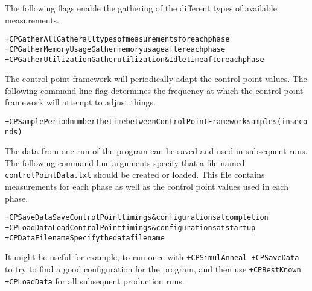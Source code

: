 The following flags enable the gathering of the different types of available measurements.
\begin{alltt} 
        +CPGatherAll            Gather all types of measurements for each phase
+CPGatherMemoryUsage            Gather memory usage after each phase
+CPGatherUtilization            Gather utilization \& Idle time after each phase
\end{alltt} 


The control point framework will periodically adapt the control point values. The following command line flag determines the frequency at which the control point framework will attempt to adjust things.
\begin{alltt} 
     +CPSamplePeriod     number The time between Control Point Framework samples (in seconds)
\end{alltt} 

The data from one run of the program can be saved and used in subsequent runs. The following command line arguments specify that a file named \texttt{controlPointData.txt} should be created or loaded. This file contains measurements for each phase as well as the control point values used in each phase. 
\begin{alltt} 
         +CPSaveData            Save Control Point timings \& configurations at completion
         +CPLoadData            Load Control Point timings \& configurations at startup
     +CPDataFilename            Specify the data filename 
\end{alltt} 

It might be useful for example, to run once with \texttt{+CPSimulAnneal +CPSaveData} to try to find a good configuration for the program, and then use  \texttt{+CPBestKnown +CPLoadData} for all subsequent production runs.

